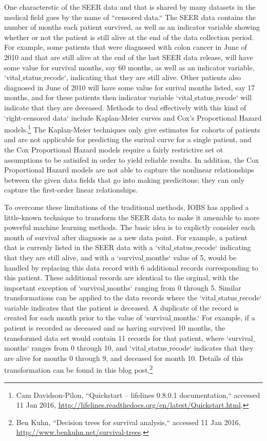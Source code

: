 \documentclass{article}
\begin{document}
One characterstic of the SEER data and that is shared by many datasets in the medical field 
goes by the name of ``censored data.`` The SEER data contains the number of months each patient survived, as well as an indicator variable showing whether or not the patient is still alive at the end of the data collection period. For example, some patients that were diagnosed with colon cancer in June of 2010 and that are still alive at the end of the last SEER data release, will have some value for survival months, say 60 months, as well as an indicator variable, `vital$\_$status$\_$recode`, indicating that they are still alive. Other patients also diagnosed in June of 2010 will have some value for surival months listed, say 17 months, and for these patients then indicator variable `vital$\_$status$\_$recode` will indicate that they are deceased. 
Methods to deal effectively with this kind of `right-censored data` include Kaplan-Meier curves
and Cox's Proportional Hazard models.\footnote{ Cam Davidson-Pilon, ``Quickstart -- lifelines 0.8.0.1 documentation,`` accessed 11 Jan 2016, \url{http://lifelines.readthedocs.org/en/latest/Quickstart.html}.} The Kaplan-Meier techniques only give estimates for cohorts of patients and are not applicable for predicting the surival curve for a single patient, and the Cox Proportional Hazard models require a fairly restrictive set ot assumptions to be satisifed in order to yield reliable results. In addition, the Cox Proportional Hazard models are not able to capture the nonlinear relationships between the given data fields that go into making predicitons; they can only capture the first-order linear relationships.

To overcome these limitations of the traditional methods, IOBS has applied a little-known technique to transform the SEER data to make it amenable to more powerful machine learning methods. The basic idea is to explictly consider each month of survival after diagnosis as a new data point. For example, a patient that is currenly listed in the SEER data with a `vital$\_$status$\_$recode` indicating that they are still alive, and with a `survival$\_$months` value of 5, would be handled by replacing this data record with 6 additional records corresponding to this patient.
These additional records are identical to the orginal, with the important exception of `survival$\_$months` ranging from 0 through 5. Similar transformations can be applied to the data records where the `vital$\_$status$\_$recode` variable indicates that the patient is deceased.
A duplicate of the record is created for each month prior to the value of `survival$\_$months.`
For example, if a patient is recorded as deceased and as having survived 10 months, the transformed data set would contain 11 records for that patient, where `survival$\_$months` ranges from 0 through 10, and `vital$\_$status$\_$recode` indicates that they are alive for months 0 through 9, and deceased for month 10.
Details of this transformation can be found in this blog post.\footnote{Ben Kuhn, ``Decision trees for survival analysis,`` accessed 11 Jan 2016, \url{http://www.benkuhn.net/survival-trees}.}
\end{document}
